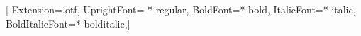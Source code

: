 \setmainfont{texgyretermes}[
    Extension=.otf,
    UprightFont= *-regular,
    BoldFont=*-bold,
    ItalicFont=*-italic,
    BoldItalicFont=*-bolditalic,]